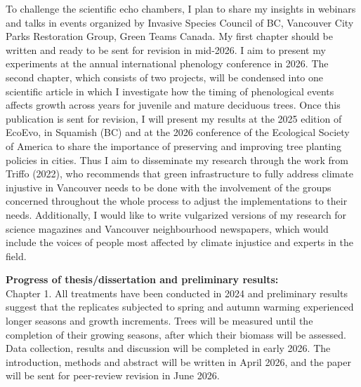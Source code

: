 \documentclass[11pt,letter]{article}
\begin{document}
To challenge the scientific echo chambers, I plan to share my insights in webinars and talks in events organized by Invasive Species Council of BC, Vancouver City Parks Restoration Group, Green Teams Canada.
My first chapter should be written and ready to be sent for revision in mid-2026. I aim to present my experiments at the annual international phenology conference in 2026. The second chapter, which consists of two projects, will be condensed into one scientific article in which I investigate how the timing of phenological events affects growth across years for juvenile and mature deciduous trees. Once this publication is sent for revision, I will present my results at the 2025 edition of EcoEvo, in Squamish (BC) and at the 2026 conference of the Ecological Society of America to share the importance of preserving and improving tree planting policies in cities. Thus I aim to disseminate my research through the work from Triffo (2022), who recommends that green infrastructure to fully address climate injustive in Vancouver needs to be done with the involvement of the groups concerned throughout the whole process to adjust the implementations to their needs. \citep{triffo_green_2022} 
Additionally, I would like to write vulgarized versions of my research for science magazines and Vancouver neighbourhood newspapers, which would include the voices of people most affected by climate injustice and experts in the field.
\par
\textbf{Progress of thesis/dissertation and preliminary results:}\\ 
Chapter 1. All treatments have been conducted in 2024 and preliminary results suggest that the replicates subjected to spring and autumn warming experienced longer seasons and growth increments. Trees will be measured until the completion of their growing seasons, after which their biomass will be assessed. Data collection, results and discussion will be completed in early 2026. The introduction, methods and abstract will be written in April 2026, and the paper will be sent for peer-review revision in June 2026.
\end{document}
